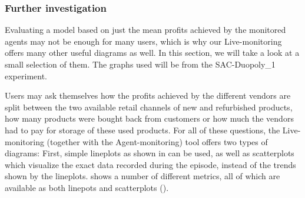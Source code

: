 \subsubsection*{Further investigation}

Evaluating a model based on just the mean profits achieved by the monitored agents may not be enough for many users, which is why our Live-monitoring offers many other useful diagrams as well. In this section, we will take a look at a small selection of them. The graphs used will be from the SAC-Duopoly\_1 experiment.

Users may ask themselves how the profits achieved by the different vendors are split between the two available retail channels of new and refurbished products, how many products were bought back from customers or how much the vendors had to pay for storage of these used products. For all of these questions, the Live-monitoring (together with the Agent-monitoring) tool offers two types of diagrams: First, simple lineplots as shown in  can be used, as well as scatterplots which visualize the exact data recorded during the episode, instead of the trends shown by the lineplots.  shows a number of different metrics, all of which are available as both linepots and scatterplots ().

